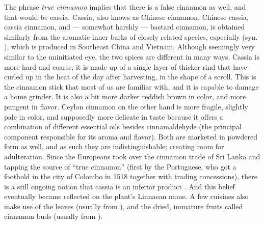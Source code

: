 The phrase \textit{true cinnamon} implies that there is a false cinnamon as well, and that would be cassia. Cassia, also knows as Chinese cinnamon, Chinese cassia, cassia cinnamon, and --- somewhat harshly --- bastard cinnamon, is obtained similarly from the aromatic inner barks of closely related species, especially  (syn. ), which is produced in Southeast China and Vietnam. Although seemingly very similar to the uninitiated eye, the two spices are different in many ways. Cassia is more hard and coarse, it is made up of a single layer of thicker rind that have curled up in the heat of the day after harvesting, in the shape of a scroll. This is the cinnamon stick that most of us are familiar with, and it is capable to damage a home grinder. It is also a bit more darker reddish brown in color, and more pungent in flavor. Ceylon cinnamon on the other hand is more fragile, slightly pale in color, and supposedly more delicate in taste because it offers a combination of different essential oils besides cinnamaldehyde (the principal component responsible for its aroma and flavor). Both are marketed in powdered form as well, and as such they are indistinguishable; creating room for adulteration. Since the Europeans took over the cinnamon trade of Sri Lanka and tapping the source of ``true cinnamon'' (first by the Portuguese, who got a foothold in the city of Colombo in 1518 together with trading concessions), there is a still ongoing notion that cassia is an inferior product \parencite{chennault_reclusive_2006}. And this belief eventually became reflected on the plant's Linnaean name. A few cuisines also make use of the leaves (usually from ), and the dried, immature fruits called cinnamon buds (usually from ).


